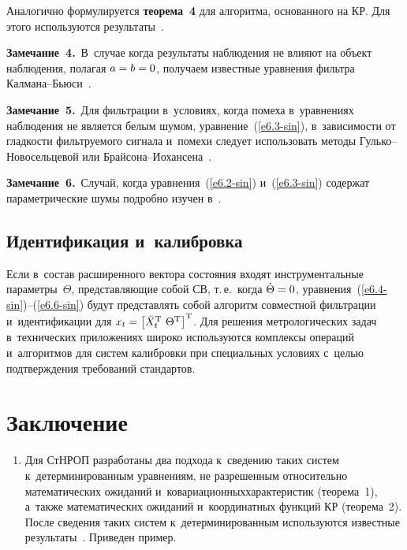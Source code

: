 \begin{multicols}{2}
Аналогично формулируется \textbf{теорема~4} для алгоритма, основанного на КР. 
Для этого используются результаты~\cite{6-sin, 7-sin}.

\smallskip

\noindent
\textbf{Замечание~4.}\ В~случае когда результаты наблюдения не влияют на объект наблюдения, полагая 
$a\hm=b\hm=0$, получаем известные уравнения фильтра Кал\-ма\-на--Бью\-си~\cite{11-sin}.

\smallskip

\noindent
\textbf{Замечание~5.}\ Для фильтрации в~условиях, когда помеха в~уравнениях наблюдения не является 
белым шумом, уравнение~(\ref{e6.3-sin}), в~зависимости от гладкости фильт\-ру\-емо\-го 
сигнала и~помехи следует использовать методы Гуль\-ко--Но\-во\-сель\-це\-вой или 
Брай\-со\-на--Ио\-хан\-се\-на~\cite{11-sin}.

\smallskip

\noindent
\textbf{Замечание~6.}\ Случай, когда уравнения~(\ref{e6.2-sin}) и~(\ref{e6.3-sin}) 
содержат параметрические шумы подробно изучен в~\cite{5-sin}.


\subsection{Идентификация и~калибровка}

Если в~со\-став расширенного вектора со\-сто\-яния входят инструментальные па\-ра\-мет\-ры~$\Theta$, 
пред\-став\-ля\-ющие собой СВ, т.\,е.\ когда $\dot \Theta \hm=0$, уравнения~(\ref{e6.4-sin})--(\ref{e6.6-sin}) 
будут пред\-став\-лять собой алгоритм совместной фильт\-ра\-ции и~идентификации для 
$x_t \hm=\lk \bar X_t^{\mathrm{T}}\ \Theta^{\mathrm{T}}\rk^{\mathrm{T}}$. Для решения метрологических задач 
в~технических приложениях широко используются комплексы операций и~алгоритмов для 
сис\-тем калибровки при специальных условиях с~\mbox{целью} под\-тверж\-де\-ния требований стандартов.


\section{ Заключение}


\noindent
\begin{enumerate}[1.]
\item  Для СтНРОП 
разработаны два подхода к~сведению таких сис\-тем к~детерминированным уравнениям, 
не разрешенным относительно математических ожиданий и~ковариационных\linebreak характеристик (тео\-ре\-ма~1), 
а~так\-же математических ожиданий и~координатных функций КР (тео\-ре\-ма~2). 
После сведения таких сис\-тем к~детерминированным используются известные результаты~\cite{1-sin, 2-sin, 5-sin}. 
Приведен пример.


\end{enumerate}
\end{multicols}
